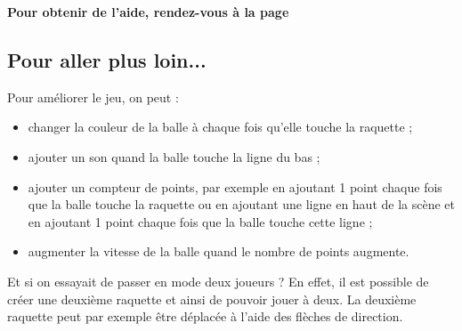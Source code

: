 \vspace{12pt}


\textbf{Pour obtenir de l'aide, rendez-vous à la page \pageref{aide_seanceScratch3}}







\subsection{Pour aller plus loin...}

Pour améliorer le jeu, on peut :

\begin{itemize}

	\item changer la couleur de la balle à chaque fois qu'elle touche la raquette ;
	\item ajouter un son quand la balle touche la ligne du bas ;
	\item ajouter un compteur de points, par exemple en ajoutant 1 point chaque fois que la balle touche la raquette ou en ajoutant une ligne en haut de la scène et en ajoutant 1 point chaque fois que la balle touche cette ligne ;
	\item augmenter la vitesse de la balle quand le nombre de points augmente.
\end{itemize}

\vspace{1em}

Et si on essayait de passer en mode deux joueurs ? En effet, il est possible de créer une deuxième raquette et ainsi de pouvoir jouer à deux. La deuxième raquette peut par exemple être déplacée à l'aide des flèches de direction.


\newpage

